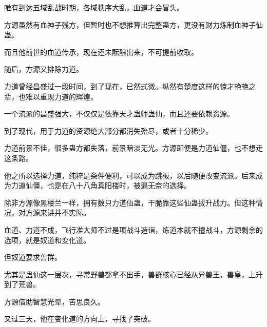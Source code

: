 \begin{this_body}
唯有到达五域乱战时期，各域秩序大乱，血道才会冒头。

方源虽然有血神子残方，但暂时也不想推算出完整蛊方，更没有财力炼制血神子仙蛊。

而且他前世的血道传承，现在还未酝酿出来，不可提前收取。

随后，方源又排除力道。

力道曾经昌盛过一段时间，到了现在，已然式微。纵然有楚度这样的惊才艳艳之辈，也难以重现力道的辉煌。

一个流派的昌盛强大，不仅仅是依靠天才蛊师蛊仙，而且还要依赖资源。

到了现代，用于力道的资源绝大部分都消失殆尽，或者十分稀少。

力道前景不佳，很多蛊方都失落，前景暗淡无光。方源即便是力道仙僵，也不想走这条路。

他之所以选择力道，纯粹是条件便利，可以成为跳板，以后随便改变流派。后来成为力道仙僵，也是在八十八角真阳楼时，被逼无奈的选择。

除非方源像黑楼兰一样，拥有数只力道仙蛊，干脆靠这些仙蛊拔升战力。但这种情况，对方源来讲并不实际。

血道、力道不成，飞行准大师不过是项战斗造诣，炼道本就不擅战斗，方源剩余的选项，就是奴道和变化道。

但奴道要求兽群。

尤其是蛊仙这一层次，寻常野兽都拿不出手，兽群核心已经从异兽王，兽皇，上升到了荒兽。

方源借助智慧光晕，苦思良久。

又过三天，他在变化道的方向上，寻找了突破。

\end{this_body}


